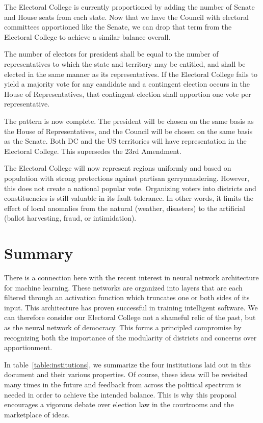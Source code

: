 \documentclass{article}
\begin{document}
The Electoral College is currently proportioned by adding the number of Senate and House seats from each state. Now that we have the Council with electoral committees apportioned like the Senate, we can drop that term from the Electoral College to achieve a similar balance overall.

\begin{quoting}
The number of electors for president shall be equal to the number of representatives to which the state and territory may be entitled, and shall be elected in the same manner as its representatives. If the Electoral College fails to yield a majority vote for any candidate and a contingent election occurs in the House of Representatives, that contingent election shall apportion one vote per representative.
\end{quoting}

The pattern is now complete. The president will be chosen on the same basis as the House of Representatives, and the Council will be chosen on the same basis as the Senate. Both DC and the US territories will have representation in the Electoral College. This supersedes the 23rd Amendment.

The Electoral College will now represent regions uniformly and based on population with strong protections against partisan gerrymandering. However, this does not create a national popular vote. Organizing voters into districts and constituencies is still valuable in its fault tolerance. In other words, it limits the effect of local anomalies from the natural (weather, disasters) to the artificial (ballot harvesting, fraud, or intimidation).

\section{Summary}

There is a connection here with the recent interest in neural network architecture for machine learning. These networks are organized into layers that are each filtered through an activation function which truncates one or both sides of its input. This architecture has proven successful in training intelligent software. We can therefore consider our Electoral College not a shameful relic of the past, but as the neural network of democracy. This forms a principled compromise by recognizing both the importance of the modularity of districts and concerns over apportionment.

In table~\ref{table:institutions}, we summarize the four institutions laid out in this document and their various properties. Of course, these ideas will be revisited many times in the future and feedback from across the political spectrum is needed in order to achieve the intended balance. This is why this proposal encourages a vigorous debate over election law in the courtrooms and the marketplace of ideas.
\end{document}
